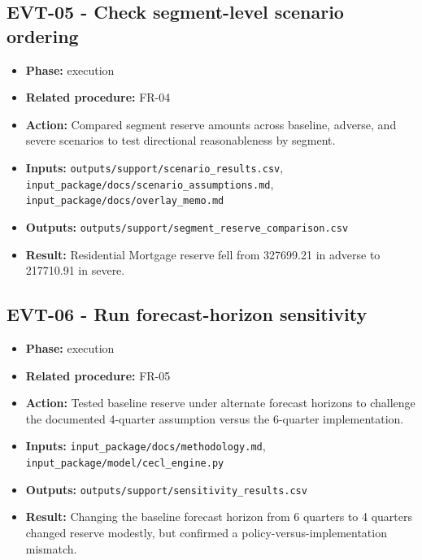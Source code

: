 \documentclass[11pt]{article}
\begin{document}
\subsection*{EVT-05 - Check segment-level scenario ordering}
\begin{itemize}
\item \textbf{Phase:} execution
\item \textbf{Related procedure:} FR-04
\item \textbf{Action:} Compared segment reserve amounts across baseline, adverse, and severe scenarios to test directional reasonableness by segment.
\item \textbf{Inputs:} \texttt{outputs/support/scenario\_results.csv}, \texttt{input\_package/docs/scenario\_assumptions.md}, \texttt{input\_package/docs/overlay\_memo.md}
\item \textbf{Outputs:} \texttt{outputs/support/segment\_reserve\_comparison.csv}
\item \textbf{Result:} Residential Mortgage reserve fell from 327699.21 in adverse to 217710.91 in severe.
\end{itemize}
\subsection*{EVT-06 - Run forecast-horizon sensitivity}
\begin{itemize}
\item \textbf{Phase:} execution
\item \textbf{Related procedure:} FR-05
\item \textbf{Action:} Tested baseline reserve under alternate forecast horizons to challenge the documented 4-quarter assumption versus the 6-quarter implementation.
\item \textbf{Inputs:} \texttt{input\_package/docs/methodology.md}, \texttt{input\_package/model/cecl\_engine.py}
\item \textbf{Outputs:} \texttt{outputs/support/sensitivity\_results.csv}
\item \textbf{Result:} Changing the baseline forecast horizon from 6 quarters to 4 quarters changed reserve modestly, but confirmed a policy-versus-implementation mismatch.
\end{itemize}
\end{document}
